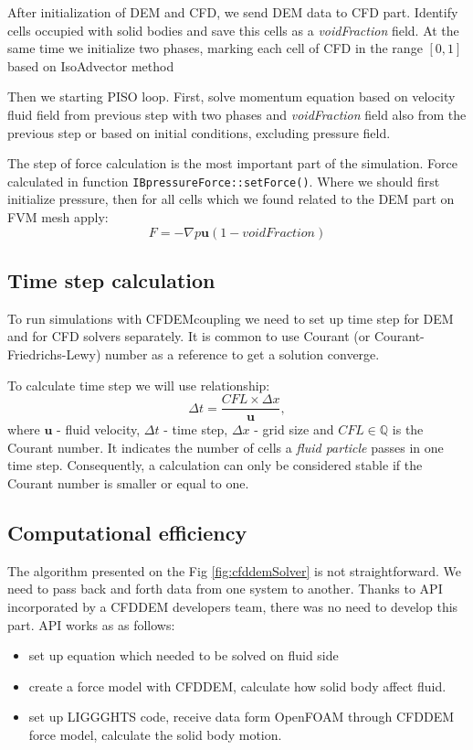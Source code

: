 After initialization of DEM and CFD, we send DEM data to CFD part. Identify cells occupied with solid bodies and save this cells as a \textit{voidFraction} field. At the same time we initialize two phases, marking each cell of CFD in the range $[0,1]$ based on IsoAdvector method \cite{roenby2019isoadvector}

Then we starting PISO loop. First, solve momentum equation based on velocity fluid field from previous step with two phases and \textit{voidFraction} field also from the previous step or based on initial conditions, excluding pressure field.

The step of force calculation is the most important part of the simulation. Force calculated in function \verb|IBpressureForce::setForce()|. Where we should first initialize pressure, then for all cells which we found related to the DEM part on FVM mesh apply:
$$
F = - \nabla p \textbf{u}(1-voidFraction)
$$

\subsection{Time step calculation}
To run simulations with CFDEMcoupling we need to set up time step for DEM and for CFD solvers separately. It is common to use Courant (or Courant-Friedrichs-Lewy) number as a reference to get a solution converge. 

To calculate time step we will use relationship:
\begin{equation}
   \Delta t =  \frac{CFL \times \Delta x}{\mathbf{u}},
\end{equation}
where $\mathbf{u}$ - fluid velocity, $\Delta t$ - time step, $\Delta x$ - grid size and $CFL \in \mathbb{Q}$ is the Courant number. It indicates the number of cells a \textit{fluid particle} passes in one time step. Consequently, a calculation can only be considered stable if the Courant number is smaller or equal to one.

\subsection{Computational efficiency}
The algorithm presented on the Fig \ref{fig:cfddemSolver} is not straightforward. We need to pass back and forth data from one system to another. Thanks to API incorporated by a CFDDEM developers team, there was no need to develop this part. API works as as follows: 
\begin{itemize}
    \item set up equation which needed to be solved on fluid side
    \item create a force model with CFDDEM, calculate how solid body affect fluid.
    \item set up LIGGGHTS code, receive data form OpenFOAM through CFDDEM force model, calculate the solid body motion.
\end{itemize}

